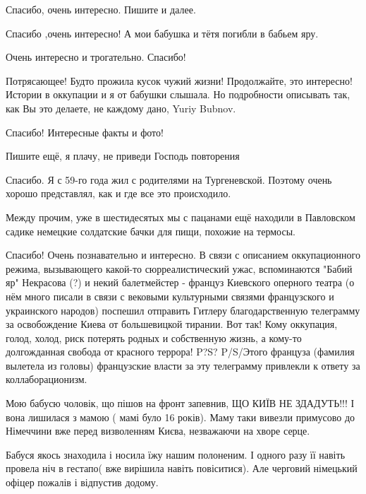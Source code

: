\begin{itemize}
Спасибо, очень интересно. Пишите и далее.

Спасибо ,очень интересно! А мои бабушка и тётя погибли в бабьем яру.

Очень интересно и трогательно. Спасибо!


Потрясающее! Будто прожила кусок чужий жизни! Продолжайте, это интересно!
Истории в оккупации и я от бабушки слышала. Но подробности описывать так, как
Вы это делаете, не каждому дано, Yuriy Bubnov.

Спасибо! Интересные факты и фото!

Пишите ещё, я плачу, не приведи Господь повторения


Спасибо. Я с 59-го года жил с родителями на Тургеневской. Поэтому очень хорошо представлял, как и где все это происходило.

Между прочим, уже в шестидесятых мы с пацанами ещё находили в Павловском садике
немецкие солдатские бачки для пищи, похожие на термосы.


Спасибо! Очень познавательно и интересно. В связи с описанием оккупационного
режима, вызывающего какой-то сюрреалистический ужас, вспоминаются "Бабий яр"
Некрасова (?) и некий балетмейстер - француз Киевского оперного театра (о нём
много писали в связи с вековыми культурными связями французского и украинского
народов) поспешил отправить Гитлеру благодарственную телеграмму за освобождение
Киева от большевицкой тирании. Вот так! Кому оккупация, голод, холод, риск
потерять родных и собственную жизнь, а кому-то долгожданная свобода от красного
террора! P?S? P/S/Этого француза (фамилия вылетела из головы) французские
власти за эту телеграмму привлекли к ответу за коллаборационизм.


Мою бабусю чоловік, що пішов на фронт запевнив, ЩО КИЇВ НЕ ЗДАДУТЬ!!! І вона
лишилася з мамою ( мамі було 16 років). Маму таки вивезли примусово до
Німеччини вже перед визволенням Києва, незважаючи на хворе серце.

Бабуся якось знаходила і носила їжу нашим полоненим. І одного разу її навіть
провела ніч в гестапо( вже вирішила навіть повіситися). Але черговий німецький
офіцер пожалів і відпустив додому.


\end{itemize}
